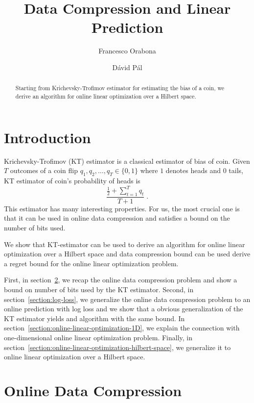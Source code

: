\documentclass{article}
\begin{document}
\title{Data Compression and Linear Prediction}
\author{Francesco Orabona \and D\'avid P\'al}

\maketitle

\begin{abstract}
Starting from Krichevsky-Trofimov estimator for estimating
the bias of a coin, we derive an algorithm for online linear
optimization over a Hilbert space.
\end{abstract}

\section{Introduction}

Krichevsky-Trofimov (KT) estimator is a classical estimator of bias of coin.
Given $T$ outcomes of a coin flip $q_1, q_2, \dots, q_T \in \{0,1\}$ where $1$
denotes heads and $0$ tails, KT estimator of coin's probability of heads is
$$
\frac{\frac{1}{2} + \sum_{t=1}^T q_t}{T + 1} \; .
$$
This estimator has many interesting properties. For us, the most crucial one is
that it can be used in online data compression and satisfies a bound on the
number of bits used.

We show that KT-estimator can be used to derive an algorithm for online linear
optimization over a Hilbert space and data compression bound can be used derive
a regret bound for the online linear optimization problem.

First, in section~\ref{section:online-data-compression}, we recap the online
data compression problem and show a bound on number of bits used by the KT
estimator.  Second, in section~\ref{section:log-loss}, we generalize the online
data compression problem to an online prediction with log loss and we show that
a obvious generalization of the KT estimator yields and algorithm with the same
bound. In section~\ref{section:online-linear-optimization-1D}, we explain the
connection with one-dimensional online linear optimization problem.
Finally, in section~\ref{section:online-linear-optimization-hilbert-space},
we generalize it to online linear optimization over a Hilbert space.

\section{Online Data Compression}
\label{section:online-data-compression}
\end{document}
